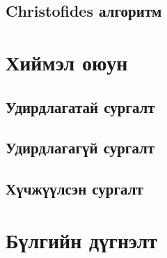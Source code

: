 \subsection{Christofides алгоритм}

\section{Хиймэл оюун}

\subsection{Удирдлагатай сургалт}

\subsection{Удирдлагагүй сургалт}

\subsection{Хүчжүүлсэн сургалт}

\section{Бүлгийн дүгнэлт}